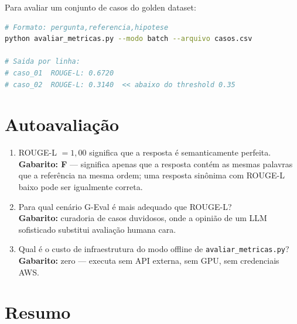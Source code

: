 Para avaliar um conjunto de casos do golden dataset:

\begin{lstlisting}[language=bash,
  caption={Avalia\c{c}\~ao em lote via CSV.},
  label={lst:avaliacao_batch}]
# Formato: pergunta,referencia,hipotese
python avaliar_metricas.py --modo batch --arquivo casos.csv

# Saida por linha:
# caso_01  ROUGE-L: 0.6720
# caso_02  ROUGE-L: 0.3140  << abaixo do threshold 0.35
\end{lstlisting}

\section{Autoavalia\c{c}\~ao}

\begin{enumerate}[leftmargin=*]
  \item ROUGE-L $= 1{,}00$ significa que a resposta \'e
        semanticamente perfeita.\\
        \textbf{Gabarito: F} --- significa apenas que a resposta
        cont\'em as mesmas palavras que a refer\^encia na mesma
        ordem; uma resposta sin\^onima com ROUGE-L baixo pode ser
        igualmente correta.

  \item Para qual cen\'ario G-Eval \'e mais adequado que ROUGE-L?\\
        \textbf{Gabarito:} curadoria de casos duvidosos, onde a
        opini\~ao de um LLM sofisticado substitui avalia\c{c}\~ao
        humana cara.

  \item Qual \'e o custo de infraestrutura do modo offline de
        \texttt{avaliar\_metricas.py}?\\
        \textbf{Gabarito:} zero --- executa sem API externa,
        sem GPU, sem credenciais AWS.
\end{enumerate}

\section{Resumo}

